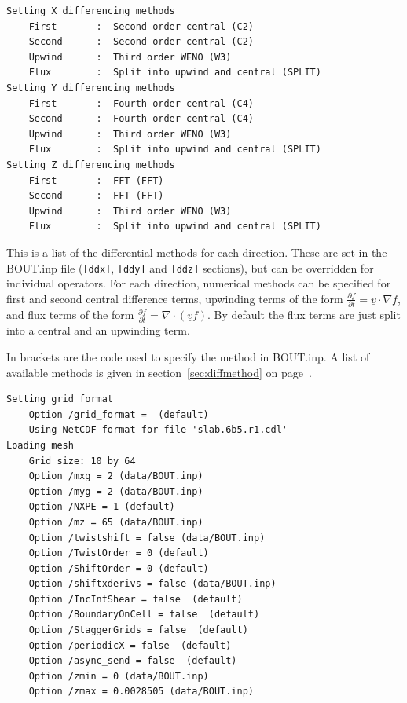 \documentclass[12pt]{article}
\newcommand{\code}[1]{\texttt{#1}}
\newcommand{\deriv}[2]{\ensuremath{\frac{\partial #1}{\partial #2}}}
\begin{document}
\begin{verbatim}
Setting X differencing methods
	First       :  Second order central (C2)
	Second      :  Second order central (C2)
	Upwind      :  Third order WENO (W3)
	Flux        :  Split into upwind and central (SPLIT)
Setting Y differencing methods
	First       :  Fourth order central (C4)
	Second      :  Fourth order central (C4)
	Upwind      :  Third order WENO (W3)
	Flux        :  Split into upwind and central (SPLIT)
Setting Z differencing methods
	First       :  FFT (FFT)
	Second      :  FFT (FFT)
	Upwind      :  Third order WENO (W3)
	Flux        :  Split into upwind and central (SPLIT)
\end{verbatim}

This is a list of the differential methods for each direction. These are set in the 
BOUT.inp file (\code{[ddx]}, \code{[ddy]} and \code{[ddz]} sections), but can be overridden
for individual operators. For each direction, numerical methods can be specified for
first and second central difference terms, upwinding terms of the form
$\deriv{f}{t} = \underline{v}\cdot\nabla f$,
and flux terms of the form $\deriv{f}{t} = \nabla\cdot\left(\underline{v}f\right)$.
By default the flux terms are just split into a central and an upwinding term.

In brackets are the code used to specify the method in BOUT.inp. A list
of available methods is given in section~\ref{sec:diffmethod} on page~\pageref{sec:diffmethod}.

\begin{verbatim}
Setting grid format
	Option /grid_format =  (default)
	Using NetCDF format for file 'slab.6b5.r1.cdl'
Loading mesh
	Grid size: 10 by 64
	Option /mxg = 2 (data/BOUT.inp)
	Option /myg = 2 (data/BOUT.inp)
	Option /NXPE = 1 (default)
	Option /mz = 65 (data/BOUT.inp)
	Option /twistshift = false (data/BOUT.inp)
	Option /TwistOrder = 0 (default)
	Option /ShiftOrder = 0 (default)
	Option /shiftxderivs = false (data/BOUT.inp)
	Option /IncIntShear = false  (default)
	Option /BoundaryOnCell = false  (default)
	Option /StaggerGrids = false  (default)
	Option /periodicX = false  (default)
	Option /async_send = false  (default)
	Option /zmin = 0 (data/BOUT.inp)
	Option /zmax = 0.0028505 (data/BOUT.inp)
\end{verbatim}
\end{document}

